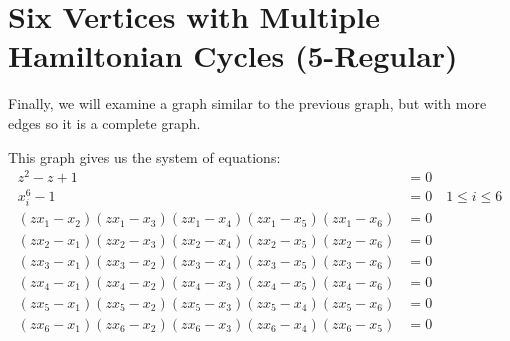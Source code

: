 \documentclass[letterpaper]{article}
\newcommand{\aln}[1]{\begin{align*} #1 \end{align*}} %
\begin{document}
\section{Six Vertices with Multiple Hamiltonian Cycles (5-Regular)}
Finally, we will examine a graph similar to the previous graph, but with more edges so it is a complete graph.
\begin{center}
\end{center}
This graph gives us the system of equations:
\aln{
  z^2 - z + 1 &= 0\\
  x_i^6 - 1 &= 0 \quad 1 \leq i \leq 6\\
  (z x_1 - x_2) (z x_1 - x_3) (z x_1 - x_4) (z x_1 - x_5) (z x_1 - x_6) &= 0\\
  (z x_2 - x_1) (z x_2 - x_3) (z x_2 - x_4) (z x_2 - x_5) (z x_2 - x_6) &= 0\\
  (z x_3 - x_1) (z x_3 - x_2) (z x_3 - x_4) (z x_3 - x_5) (z x_3 - x_6) &= 0\\
  (z x_4 - x_1) (z x_4 - x_2) (z x_4 - x_3) (z x_4 - x_5) (z x_4 - x_6) &= 0\\
  (z x_5 - x_1) (z x_5 - x_2) (z x_5 - x_3) (z x_5 - x_4) (z x_5 - x_6) &= 0\\
  (z x_6 - x_1) (z x_6 - x_2) (z x_6 - x_3) (z x_6 - x_4) (z x_6 - x_5) &= 0
}
\end{document}
